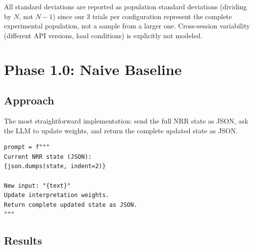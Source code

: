 \documentclass[11pt,a4paper]{article}
\begin{document}
\noindent All standard deviations are reported as population standard deviations
(dividing by $N$, not $N{-}1$) since our 3 trials per configuration represent
the complete experimental population, not a sample from a larger one.
Cross-session variability (different API versions, load conditions) is
explicitly not modeled.

\section{Phase 1.0: Naive Baseline}
\label{sec:phase1_0}

\subsection{Approach}

The most straightforward implementation: send the full NRR state as JSON, ask the
LLM to update weights, and return the complete updated state as JSON.

\begin{lstlisting}
prompt = f"""
Current NRR state (JSON):
{json.dumps(state, indent=2)}

New input: "{text}"
Update interpretation weights.
Return complete updated state as JSON.
"""
\end{lstlisting}

\subsection{Results}
\end{document}
